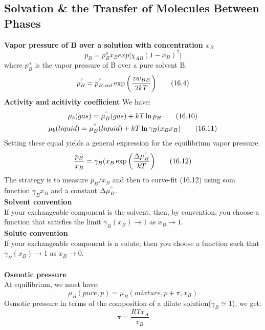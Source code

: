 \documentclass[8pt]{article}
\numberwithin{equation}{section}
\begin{document}
\begin{multicols}{2}
\section{Solvation \& the Transfer of Molecules Between Phases}
\textbf{Vapor pressure of B over a solution with concentration $x_{B}$}
\begin{equation}
p_{B}=p_{B}^{o}x_{B}exp\bigg[\chi_{AB}(1-x_{B})^{2} \bigg]
\end{equation}
where $p_{B}^{o}$ is the vapor pressure of B over a pure solvent B. 
\begin{equation}
p_{B}^{\degree}=p_{B,int}^{\degree}\exp\bigg(\frac{zw_{BB}}{2kT}\bigg) \tag{16.4}
\end{equation}
\textbf{Activity and acitivity coefficient}
We have: 
\begin{gather}
\mu_{b}(gas)=\mu_{B}^{\degree}(gas)+kT\ln{p_{B}} \tag{16.10} \\
\mu_{b}(liquid)=\mu_{B}^{\degree}(liquid)+kT\ln{\gamma_{B}(x_{B}x_{B})} \tag{16.11}
\end{gather}
Setting these equal yields a general expression for the equilibrium vapor pressure. 
\begin{equation}
\frac{p_{B}}{x_{B}}=\gamma_{B}(x_{B}\exp\bigg(\frac{\Delta \mu_{B}^{\degree}}{kT} \bigg) \tag{16.12}
\end{equation}
The strategy is to measure $p_{B}/x_{B}$ and then to curve-fit (16.12) using som function $\gamma_{B}x_{B}$ and a constant $\Delta \mu_{B}^{\degree}$.\\
\textbf{Solvent convention} \\
If your exchangeable component is the solvent, then, by convention, you choose a function that satisfies the limit $\gamma_{B}(x_{B})\rightarrow 1$ as $x_{B}\rightarrow 1$. \\
\textbf{Solute convention} \\
If your exchangeable component is a solute, then you choose a function such that $\gamma_{B}(x_{B})\rightarrow 1$ as $x_{B}\rightarrow 0$. \\ \\
\textbf{Osmotic pressure} \\ 
At equilibrium, we must have: 
\begin{equation}
\mu_{B}(pure,p)=\mu_{B}(mixture, p+\pi, x_{B}) \tag{16.30}
\end{equation}
Osmotic pressure in terms of the composition of a dilute solution($\gamma_{B}\simeq1$), we get:
\begin{equation}
\pi=\frac{RTx_{A}}{v_{B}} \tag{16.36}
\end{equation}

\end{multicols}
\end{document}
